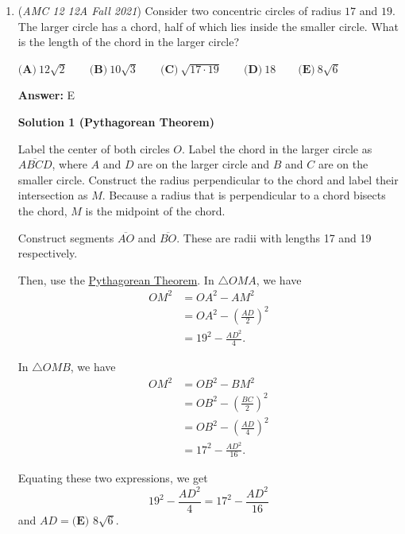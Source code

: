 \begin{enumerate}
 \textbf{Remark} By the long division algorithm, you can work from left to right accumulating the answer, and don't need to count the digits to get the power. You only need to take the current leading digit modulo $5$, negate it, and add it to the next digit, and repeat the process until you reach the units digit.

 


	\item (\textit{AMC 12 12A Fall 2021}) Consider two concentric circles of radius $17$ and $19.$ The larger circle has a chord, half of which lies inside the smaller circle. What is the length of the chord in the larger circle?


 $\textbf{(A)}\ 12\sqrt{2} \qquad\textbf{(B)}\ 10\sqrt{3} \qquad\textbf{(C)}\ \sqrt{17 \cdot 19} \qquad\textbf{(D)}\ 18 \qquad\textbf{(E)}\ 8\sqrt{6}$

 \textbf{Answer: }E



\textbf{Solution 1 (Pythagorean Theorem)}

Label the center of both circles $O$. Label the chord in the larger circle as $\overline{ABCD}$, where $A$ and $D$ are on the larger circle and $B$ and $C$ are on the smaller circle. Construct the radius perpendicular to the chord and label their intersection as $M$. Because a radius that is perpendicular to a chord bisects the chord, $M$ is the midpoint of the chord. 

 Construct segments $\overline{AO}$ and $\overline{BO}$. These are radii with lengths 17 and 19 respectively. 

 Then, use the \href{https://artofproblemsolving.com/wiki/index.php?title=Pythagorean\_Theorem}{Pythagorean Theorem}. In $\triangle OMA$, we have
 \begin{align*} OM^2 & = OA^2 - AM^2 \\ & = OA^2 - \left( \frac{AD}{2} \right)^2 \\ & = 19^2 - \frac{AD^2}{4} . \end{align*}


 In $\triangle OMB$, we have
 \begin{align*} OM^2 & = OB^2 - BM^2 \\ & = OB^2 - \left( \frac{BC}{2} \right)^2 \\ & = OB^2 - \left( \frac{AD}{4} \right)^2 \\ & = 17^2 - \frac{AD^2}{16} . \end{align*}


 Equating these two expressions, we get 
 \[19^2 - \frac{AD^2}{4} = 17^2 - \frac{AD^2}{16}\]and $AD=\boxed{\textbf{(E) }8 \sqrt{6}}$.


\end{enumerate}
